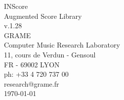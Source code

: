 \documentclass[a4paper]{book}
\begin{document}
\begin{titlepage}
\vspace*{7cm}
\begin{center}
{\huge INScore\\ Augmented Score Library \\[1ex]\large v.1.28}\\
\vspace*{2cm}
{\large GRAME \\ Computer Music Research Laboratory}\\
\vspace*{0.5cm}
{\small 11, cours de Verdun - Gensoul}\\
{\small FR - 69002 LYON}\\
\vspace*{0.5cm}
{\small ph:  +33 4 720 737 00}\\
\vspace*{0.5cm}
{\small research@grame.fr}\\
\vspace*{0.5cm}
\today 
\end{center}
\end{titlepage}
\clearemptydoublepage
{}
\tableofcontents
\clearemptydoublepage
{}
\end{document}

